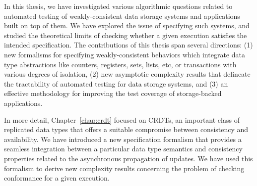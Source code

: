 
In this thesis, we have investigated various algorithmic questions related to automated testing of weakly-consistent data storage systems and applications built on top of them. We have explored the issue of specifying such systems, and studied the theoretical limits of checking whether a given execution satisfies the intended specification.
 The contributions of this thesis span several directions: (1) new formalisms for specifying weakly-consistent behaviors which integrate data type abstractions like counters, registers, sets, lists, etc, or transactions with various degrees of isolation, (2) new asymptotic complexity results that delineate the tractability of automated testing for data storage systems, and (3) an effective methodology for improving the test coverage of storage-backed applications.


In more detail, Chapter~\ref{chap:crdt} focused on CRDTs, an important class of replicated data types that offers a suitable compromise between consistency and availability. We have introduced a new specification formalism that provides a seamless integration between a particular data type semantics and consistency properties related to the asynchronous propagation of updates. We have used this formalism to derive new complexity results concerning the problem of checking conformance for a given execution. 


